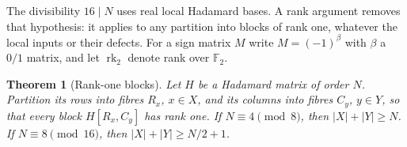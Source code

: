 \documentclass[11pt,reqno]{amsart}
\newtheorem{theorem}{Theorem}[section]
\theoremstyle{remark}\newtheorem{remark}[theorem]{Remark}
\begin{document}
The divisibility \(16\mid N\) uses real local Hadamard bases. A rank argument removes that hypothesis: it applies to any partition into blocks of rank one, whatever the local inputs or their defects. For a sign matrix \(M\) write \(M=(-1)^{\beta}\) with \(\beta\) a \(0/1\) matrix, and let \(\operatorname{rk}_2\) denote rank over \(\mathbb F_2\).

\begin{theorem}[Rank-one blocks]\label{th:tworank}
Let \(H\) be a Hadamard matrix of order \(N\). Partition its rows into fibres \(R_x\), \(x\in X\), and its columns into fibres \(C_y\), \(y\in Y\), so that every block \(H[R_x,C_y]\) has rank one. If \(N\equiv4\pmod 8\), then \(|X|+|Y|\ge N\). If \(N\equiv8\pmod{16}\), then \(|X|+|Y|\ge N/2+1\).
\end{theorem}
\end{document}
